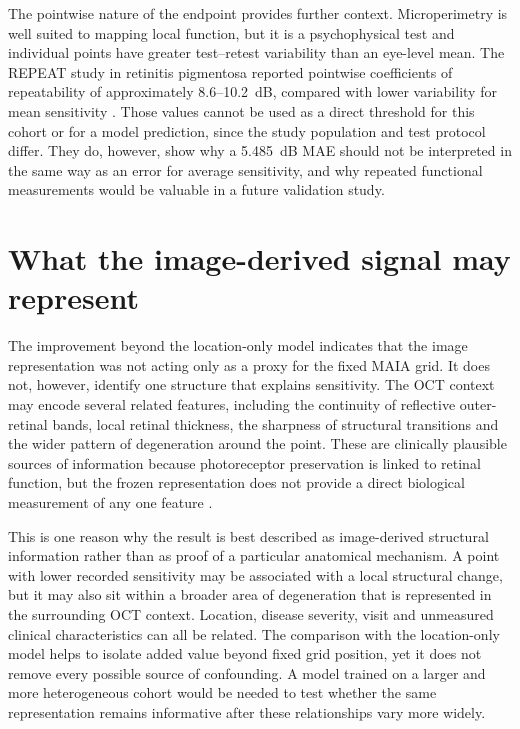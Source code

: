 The pointwise nature of the endpoint provides further context. Microperimetry is well suited to mapping local function, but it is a psychophysical test and individual points have greater test--retest variability than an eye-level mean. The REPEAT study in retinitis pigmentosa reported pointwise coefficients of repeatability of approximately 8.6--10.2~dB, compared with lower variability for mean sensitivity \citep{Karuntu2025}. Those values cannot be used as a direct threshold for this cohort or for a model prediction, since the study population and test protocol differ. They do, however, show why a 5.485~dB MAE should not be interpreted in the same way as an error for average sensitivity, and why repeated functional measurements would be valuable in a future validation study.

\section{What the image-derived signal may represent}

The improvement beyond the location-only model indicates that the image representation was not acting only as a proxy for the fixed MAIA grid. It does not, however, identify one structure that explains sensitivity. The OCT context may encode several related features, including the continuity of reflective outer-retinal bands, local retinal thickness, the sharpness of structural transitions and the wider pattern of degeneration around the point. These are clinically plausible sources of information because photoreceptor preservation is linked to retinal function, but the frozen representation does not provide a direct biological measurement of any one feature \citep{Tao2016,Gill2022}.

This is one reason why the result is best described as image-derived structural information rather than as proof of a particular anatomical mechanism. A point with lower recorded sensitivity may be associated with a local structural change, but it may also sit within a broader area of degeneration that is represented in the surrounding OCT context. Location, disease severity, visit and unmeasured clinical characteristics can all be related. The comparison with the location-only model helps to isolate added value beyond fixed grid position, yet it does not remove every possible source of confounding. A model trained on a larger and more heterogeneous cohort would be needed to test whether the same representation remains informative after these relationships vary more widely.

